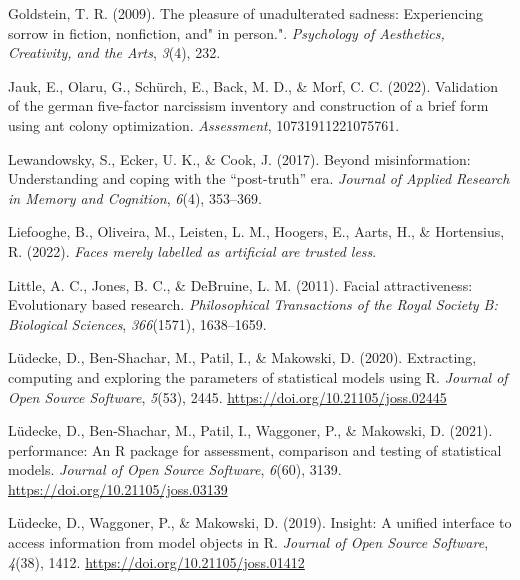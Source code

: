 \documentclass[
  man,floatsintext]{apa6}
\newlength{\cslhangindent}
\newlength{\cslentryspacingunit} %
\newenvironment{CSLReferences}[2] %
 {%
  \setlength{\parindent}{0pt}
  \ifodd #1
  \let\oldpar\par
  \def\par{\hangindent=\cslhangindent\oldpar}
  \fi
  \setlength{\parskip}{#2\cslentryspacingunit}
 }%
 {}
\begin{document}
\begin{CSLReferences}{1}{0}
\leavevmode{}%
Goldstein, T. R. (2009). The pleasure of unadulterated sadness: Experiencing sorrow in fiction, nonfiction, and" in person.". \emph{Psychology of Aesthetics, Creativity, and the Arts}, \emph{3}(4), 232.

\leavevmode{}%
Jauk, E., Olaru, G., Schürch, E., Back, M. D., \& Morf, C. C. (2022). Validation of the german five-factor narcissism inventory and construction of a brief form using ant colony optimization. \emph{Assessment}, 10731911221075761.

\leavevmode{}%
Lewandowsky, S., Ecker, U. K., \& Cook, J. (2017). Beyond misinformation: Understanding and coping with the {``post-truth''} era. \emph{Journal of Applied Research in Memory and Cognition}, \emph{6}(4), 353--369.

\leavevmode{}%
Liefooghe, B., Oliveira, M., Leisten, L. M., Hoogers, E., Aarts, H., \& Hortensius, R. (2022). \emph{Faces merely labelled as artificial are trusted less}.

\leavevmode{}%
Little, A. C., Jones, B. C., \& DeBruine, L. M. (2011). Facial attractiveness: Evolutionary based research. \emph{Philosophical Transactions of the Royal Society B: Biological Sciences}, \emph{366}(1571), 1638--1659.

\leavevmode{}%
Lüdecke, D., Ben-Shachar, M., Patil, I., \& Makowski, D. (2020). Extracting, computing and exploring the parameters of statistical models using {R}. \emph{Journal of Open Source Software}, \emph{5}(53), 2445. \url{https://doi.org/10.21105/joss.02445}

\leavevmode{}%
Lüdecke, D., Ben-Shachar, M., Patil, I., Waggoner, P., \& Makowski, D. (2021). {performance}: An {R} package for assessment, comparison and testing of statistical models. \emph{Journal of Open Source Software}, \emph{6}(60), 3139. \url{https://doi.org/10.21105/joss.03139}

\leavevmode{}%
Lüdecke, D., Waggoner, P., \& Makowski, D. (2019). Insight: A unified interface to access information from model objects in {R}. \emph{Journal of Open Source Software}, \emph{4}(38), 1412. \url{https://doi.org/10.21105/joss.01412}


\end{CSLReferences}
\end{document}
